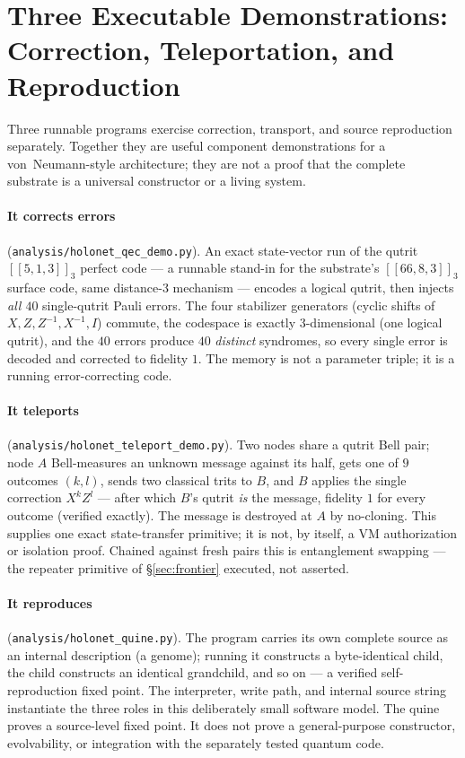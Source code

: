 \documentclass[11pt]{article}
\begin{document}
\section{Three Executable Demonstrations: Correction, Teleportation, and Reproduction}
\label{sec:prooflife}
Three runnable programs exercise correction, transport, and source reproduction separately. Together
they are useful component demonstrations for a von~Neumann-style architecture; they are not a proof
that the complete substrate is a universal constructor or a living system.

\paragraph{It corrects errors} (\texttt{analysis/holonet\_qec\_demo.py}). An exact state-vector run of
the qutrit $[[5,1,3]]_3$ perfect code --- a runnable stand-in for the substrate's
$[[66,8,3]]_3$ surface code, same distance-$3$ mechanism --- encodes a logical qutrit, then injects
\emph{all $40$} single-qutrit Pauli errors. The four stabilizer generators (cyclic shifts of
$X,Z,Z^{-1},X^{-1},I$) commute, the codespace is exactly $3$-dimensional (one logical qutrit), and the
$40$ errors produce $40$ \emph{distinct} syndromes, so every single error is decoded and corrected to
fidelity $1$. The memory is not a parameter triple; it is a running error-correcting code.

\paragraph{It teleports} (\texttt{analysis/holonet\_teleport\_demo.py}). Two nodes share a qutrit Bell
pair; node $A$ Bell-measures an unknown message against its half, gets one of $9$ outcomes $(k,l)$, sends
two classical trits to $B$, and $B$ applies the single correction $X^kZ^l$ --- after which $B$'s qutrit
\emph{is} the message, fidelity $1$ for every outcome (verified exactly). The message is destroyed at
$A$ by no-cloning. This supplies one exact state-transfer primitive; it is not, by itself, a VM
authorization or isolation proof. Chained against
fresh pairs this is entanglement swapping --- the repeater primitive of \S\ref{sec:frontier} executed,
not asserted.

\paragraph{It reproduces} (\texttt{analysis/holonet\_quine.py}). The program carries its own complete
source as an internal description (a genome); running it constructs a byte-identical child, the child
constructs an identical grandchild, and so on --- a verified self-reproduction fixed point. The
interpreter, write path, and internal source string instantiate the three roles in this deliberately
small software model. The quine proves a source-level fixed point. It does not prove a general-purpose
constructor, evolvability, or integration with the separately tested quantum code.
\end{document}
